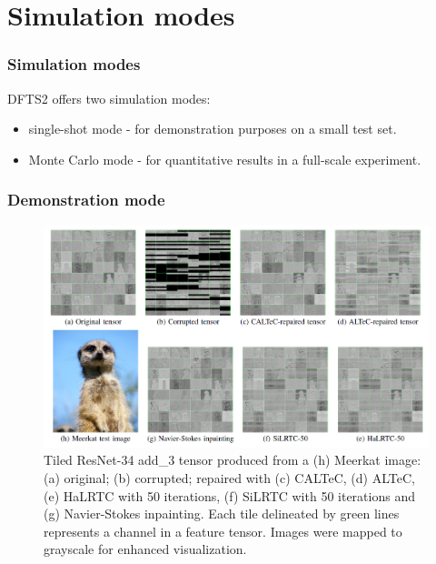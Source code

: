 \documentclass[aspectratio=169]{beamer}
\begin{document}
\section{Simulation modes}
\begin{frame}
\frametitle{Simulation modes}
DFTS2 offers two simulation modes:
	\begin{itemize}
		\item single-shot mode - for demonstration purposes on a small test set.
		\item Monte Carlo mode - for quantitative results in a full-scale experiment.
	\end{itemize}
\end{frame}

\begin{frame}
\frametitle{Demonstration mode}
	\begin{figure}[H]
		\centering
		\includegraphics[scale=0.3]{vcipfig.png}
		\caption{Tiled ResNet-34 add\_3 tensor produced from a (h) Meerkat image: (a) original; (b) corrupted; repaired with (c) CALTeC, (d) ALTeC, (e) HaLRTC with 50 iterations, (f) SiLRTC with 50 iterations and (g) Navier-Stokes inpainting. Each tile delineated by green lines represents a channel in a feature tensor. Images were mapped to grayscale for enhanced visualization.}
	\end{figure}
\end{frame}
\end{document}

